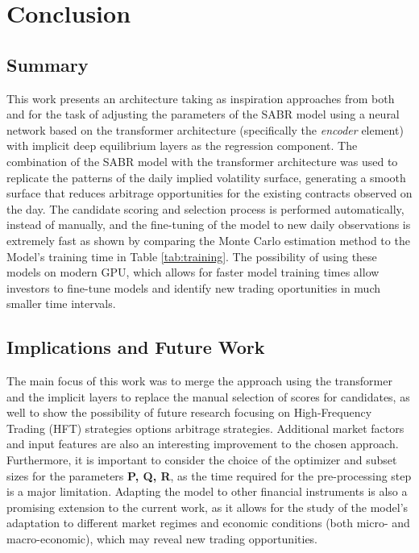 \section{Conclusion}
\subsection{Summary}

This work presents an architecture taking as inspiration approaches from both \citep{Kim2021} and \citep{Kolter2020} for the task of adjusting the parameters of the SABR model using a neural network based on the transformer architecture (specifically the \textit{encoder} element) with implicit deep equilibrium layers as the regression component. The combination of the SABR model with the transformer architecture was used to replicate the patterns of the daily implied volatility surface, generating a smooth surface that reduces arbitrage opportunities for the existing contracts observed on the day. The candidate scoring and selection process is performed automatically, instead of manually, and the fine-tuning of the model to new daily observations is extremely fast as shown by comparing the Monte Carlo estimation method to the Model's training time in Table \ref{tab:training}. The possibility of using these models on modern GPU, which allows for faster model training times allow investors to fine-tune models and identify new trading oportunities in much smaller time intervals.

\subsection{Implications and Future Work}

The main focus of this work was to merge the approach using the transformer and the implicit layers to replace the manual selection of scores for candidates, as well to show the possibility of future research focusing on High-Frequency Trading (HFT) strategies options arbitrage strategies. Additional market factors and input features are also an interesting improvement to the chosen approach. Furthermore, it is important to consider the choice of the optimizer and subset sizes for the parameters \textbf{P, Q, R}, as the time required for the pre-processing step is a major limitation. Adapting the model to other financial instruments is also a promising extension to the current work, as it allows for the study of the model's adaptation to different market regimes and economic conditions (both micro- and macro-economic), which may reveal new trading opportunities.
